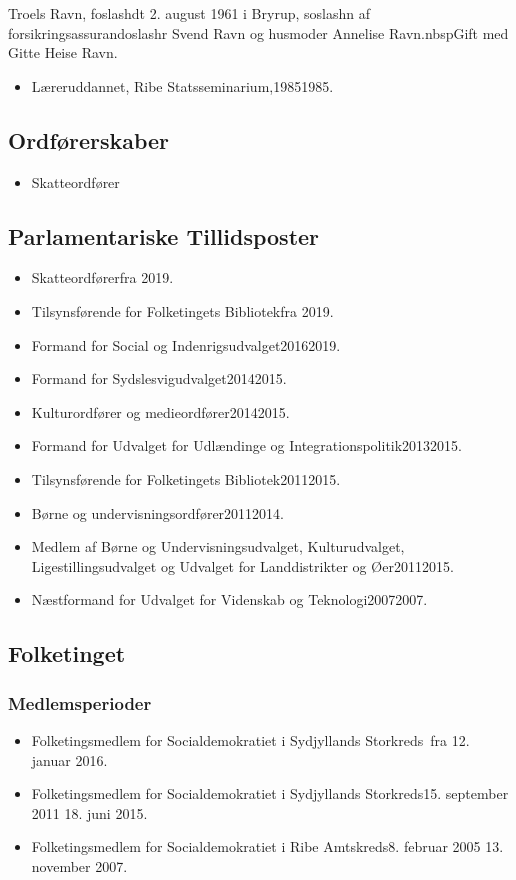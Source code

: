 \documentclass[11pt, a4paper]{awesome-cv}
\begin{document}
\makecvheader[R]
\makelettertitle
\begin{cvletter}
Troels Ravn, foslashdt 2. august 1961 i Bryrup, soslashn af forsikringsassurandoslashr Svend Ravn og husmoder Annelise Ravn.nbspGift med Gitte Heise Ravn.

\begin{itemize}
\item Læreruddannet, Ribe Statsseminarium,19851985.
\end{itemize}
\subsection*{Ordførerskaber}
\begin{itemize}
\item Skatteordfører
\end{itemize}
\subsection*{Parlamentariske Tillidsposter}
\begin{itemize}
\item Skatteordførerfra 2019.
\item Tilsynsførende for Folketingets Bibliotekfra 2019.
\item Formand for Social og Indenrigsudvalget20162019.
\item Formand for Sydslesvigudvalget20142015.
\item Kulturordfører og medieordfører20142015.
\item Formand for Udvalget for Udlændinge og Integrationspolitik20132015.
\item Tilsynsførende for Folketingets Bibliotek20112015.
\item Børne og undervisningsordfører20112014.
\item Medlem af Børne og Undervisningsudvalget, Kulturudvalget, Ligestillingsudvalget og Udvalget for Landdistrikter og Øer20112015.
\item Næstformand for Udvalget for Videnskab og Teknologi20072007.
\end{itemize}
\subsection*{Folketinget}
\subsubsection*{Medlemsperioder}
\begin{itemize}
\item Folketingsmedlem for Socialdemokratiet i Sydjyllands Storkreds fra 12. januar 2016.
\item Folketingsmedlem for Socialdemokratiet i Sydjyllands Storkreds15. september 2011  18. juni 2015.
\item Folketingsmedlem for Socialdemokratiet i Ribe Amtskreds8. februar 2005  13. november 2007.
\end{itemize}

\end{cvletter}
\end{document}
